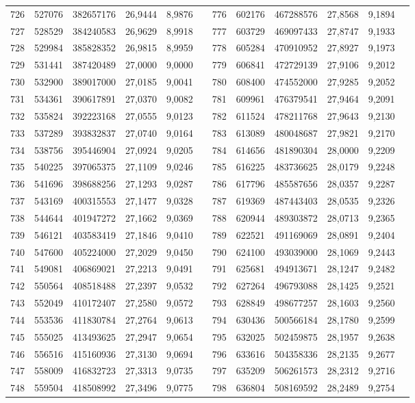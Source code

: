 \begin{longtable}{p{.17\linewidth}*{11}{S}}
726&527076&382657176&26,9444&8,9876&&776&602176&467288576&27,8568&9,1894\\
727&528529&384240583&26,9629&8,9918&&777&603729&469097433&27,8747&9,1933\\
728&529984&385828352&26,9815&8,9959&&778&605284&470910952&27,8927&9,1973\\
729&531441&387420489&27,0000&9,0000&&779&606841&472729139&27,9106&9,2012\\
730&532900&389017000&27,0185&9,0041&&780&608400&474552000&27,9285&9,2052\\
731&534361&390617891&27,0370&9,0082&&781&609961&476379541&27,9464&9,2091\\
732&535824&392223168&27,0555&9,0123&&782&611524&478211768&27,9643&9,2130\\
733&537289&393832837&27,0740&9,0164&&783&613089&480048687&27,9821&9,2170\\
734&538756&395446904&27,0924&9,0205&&784&614656&481890304&28,0000&9,2209\\
735&540225&397065375&27,1109&9,0246&&785&616225&483736625&28,0179&9,2248\\
736&541696&398688256&27,1293&9,0287&&786&617796&485587656&28,0357&9,2287\\
737&543169&400315553&27,1477&9,0328&&787&619369&487443403&28,0535&9,2326\\
738&544644&401947272&27,1662&9,0369&&788&620944&489303872&28,0713&9,2365\\
739&546121&403583419&27,1846&9,0410&&789&622521&491169069&28,0891&9,2404\\
740&547600&405224000&27,2029&9,0450&&790&624100&493039000&28,1069&9,2443\\
741&549081&406869021&27,2213&9,0491&&791&625681&494913671&28,1247&9,2482\\
742&550564&408518488&27,2397&9,0532&&792&627264&496793088&28,1425&9,2521\\
743&552049&410172407&27,2580&9,0572&&793&628849&498677257&28,1603&9,2560\\
744&553536&411830784&27,2764&9,0613&&794&630436&500566184&28,1780&9,2599\\
745&555025&413493625&27,2947&9,0654&&795&632025&502459875&28,1957&9,2638\\
746&556516&415160936&27,3130&9,0694&&796&633616&504358336&28,2135&9,2677\\
747&558009&416832723&27,3313&9,0735&&797&635209&506261573&28,2312&9,2716\\
748&559504&418508992&27,3496&9,0775&&798&636804&508169592&28,2489&9,2754\\

\end{longtable}
